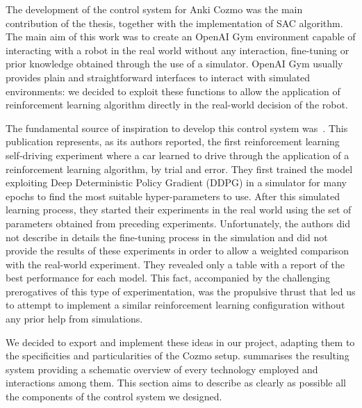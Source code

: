The development of the control system for Anki Cozmo was the main contribution of the thesis, together with the implementation of SAC algorithm.
The main aim of this work was to create an OpenAI Gym environment capable of interacting with a robot in the real world without any interaction, fine-tuning or prior knowledge obtained through the use of a simulator.
OpenAI Gym usually provides plain and straightforward interfaces to interact with simulated environments: we decided to exploit these functions to allow the application of reinforcement learning algorithm directly in the real-world decision of the robot.


The fundamental source of inspiration to develop this control system was~\cite{kendall2018learning,kendall2019learning}.
This publication represents, as its authors reported, the first reinforcement learning self-driving experiment where a car learned to drive through the application of a reinforcement learning algorithm, by trial and error.
They first trained the model exploiting Deep Deterministic Policy Gradient (DDPG) in a simulator for many epochs to find the most suitable hyper-parameters to use.
After this simulated learning process, they started their experiments in the real world using the set of parameters obtained from preceding experiments.
Unfortunately, the authors did not describe in details the fine-tuning process in the simulation and did not provide the results of these experiments in order to allow a weighted comparison with the real-world experiment.
They revealed only a  table with a report of the best performance for each model.
This fact, accompanied by the challenging prerogatives of this type of experimentation, was the propulsive thrust that led us to attempt to implement a similar reinforcement learning configuration without any prior help from simulations.

We decided to export and implement these ideas in our project, adapting them to the specificities and particularities of the Cozmo setup.
 summarises the resulting system providing a schematic overview of every technology employed and interactions among them.
This section aims to describe as clearly as possible all the components of the control system we designed.


